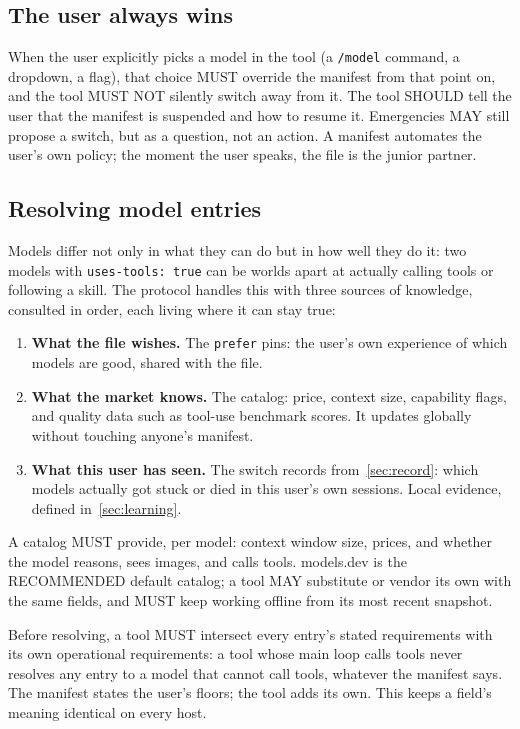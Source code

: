 \documentclass[11pt]{article}
\newcommand{\key}[1]{\texttt{#1}}
\begin{document}
\subsection{The user always wins}
\label{sec:userwins}

When the user explicitly picks a model in the tool (a \key{/model} command, a
dropdown, a flag), that choice MUST override the manifest from that point
on, and the tool MUST NOT silently switch away from it. The tool SHOULD
tell the user that the manifest is suspended and how to resume it.
Emergencies MAY still propose a switch, but as a question, not an action.
A manifest automates the user's own policy; the moment the user speaks,
the file is the junior partner.

\subsection{Resolving model entries}
\label{sec:resolving}

Models differ not only in what they can do but in how well they do it:
two models with \key{uses-tools: true} can be worlds apart at actually
calling tools or following a skill. The protocol handles this with three
sources of knowledge, consulted in order, each living where it can stay
true:

\begin{enumerate}
  \item \textbf{What the file wishes.} The \key{prefer} pins: the user's own
        experience of which models are good, shared with the file.
  \item \textbf{What the market knows.} The catalog: price, context size,
        capability flags, and quality data such as tool-use benchmark
        scores. It updates globally without touching anyone's manifest.
  \item \textbf{What this user has seen.} The switch records
        from~\ref{sec:record}: which models actually got stuck or died in
        this user's own sessions. Local evidence, defined
        in~\ref{sec:learning}.
\end{enumerate}

A catalog MUST provide, per model: context window size, prices, and
whether the model reasons, sees images, and calls tools. models.dev is
the RECOMMENDED default catalog; a tool MAY substitute or vendor its own
with the same fields, and MUST keep working offline from its most recent
snapshot.

Before resolving, a tool MUST intersect every entry's stated
requirements with its own operational requirements: a tool whose main
loop calls tools never resolves any entry to a model that cannot call
tools, whatever the manifest says. The manifest states the user's
floors; the tool adds its own. This keeps a field's meaning identical
on every host.
\end{document}
